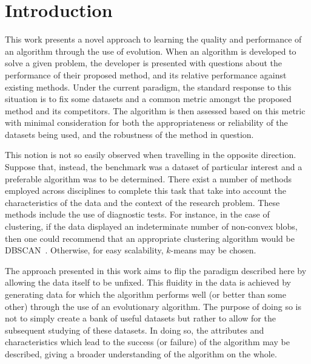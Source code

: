 \section{Introduction}\label{section:introduction}

This work presents a novel approach to learning the quality and performance of
an algorithm through the use of evolution. When an algorithm is developed to
solve a given problem, the developer is presented with questions about the
performance of their proposed method, and its relative performance against
existing methods. Under the current paradigm, the standard response to this
situation is to fix some datasets and a common metric amongst the proposed
method and its competitors. The algorithm is then assessed based on this metric
with minimal consideration for both the appropriateness or reliability of the
datasets being used, and the robustness of the method in question.

This notion is not so easily observed when travelling in the opposite direction.
Suppose that, instead, the benchmark was a dataset of particular interest and a
preferable algorithm was to be determined. There exist a number of methods
employed across disciplines to complete this task that take into account the
characteristics of the data and the context of the research problem. These
methods include the use of diagnostic tests. For instance, in the case of
clustering, if the data displayed an indeterminate number of non-convex blobs,
then one could recommend that an appropriate clustering algorithm would be
DBSCAN~\cite{Ester1996}. Otherwise, for easy scalability, \(k\)-means may be
chosen.

The approach presented in this work aims to flip the paradigm described here by
allowing the data itself to be unfixed. This fluidity in the data is achieved by
generating data for which the algorithm performs well (or better than some
other) through the use of an evolutionary algorithm. The purpose of doing so is
not to simply create a bank of useful datasets but rather to allow for the
subsequent studying of these datasets. In doing so, the attributes and
characteristics which lead to the success (or failure) of the algorithm may be
described, giving a broader understanding of the algorithm on the whole.


